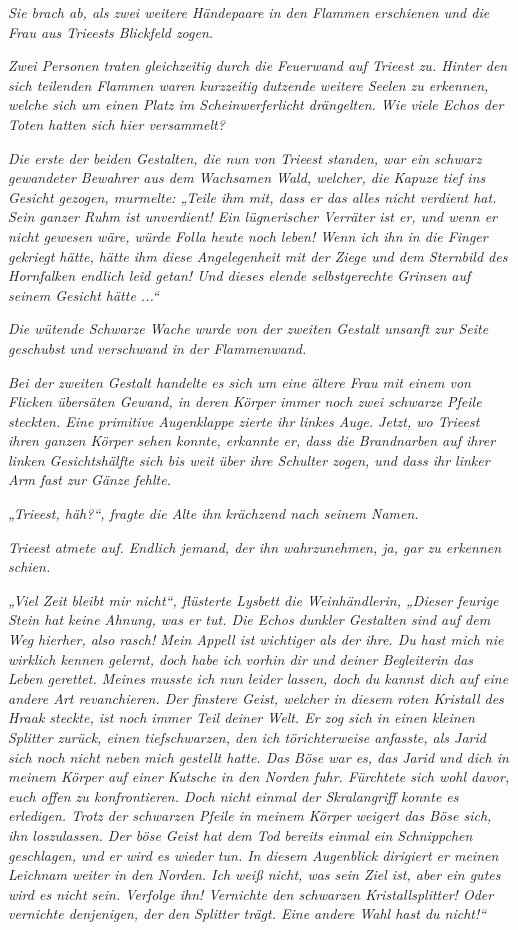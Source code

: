 \textit{Sie brach ab, als zwei weitere Händepaare in den Flammen erschienen und die Frau aus Trieests Blickfeld zogen.}

\textit{Zwei Personen traten gleichzeitig durch die Feuerwand auf Trieest zu. Hinter den sich teilenden Flammen waren kurzzeitig dutzende weitere Seelen zu erkennen, welche sich um einen Platz im Scheinwerferlicht drängelten. Wie viele Echos der Toten hatten sich hier versammelt?}

\textit{Die erste der beiden Gestalten, die nun von Trieest standen, war ein schwarz gewandeter Bewahrer aus dem Wachsamen Wald, welcher, die Kapuze tief ins Gesicht gezogen, murmelte: „Teile ihm mit, dass er das alles nicht verdient hat. Sein ganzer Ruhm ist unverdient! Ein lügnerischer Verräter ist er, und wenn er nicht gewesen wäre, würde Folla heute noch leben! Wenn ich ihn in die Finger gekriegt hätte, hätte ihm diese Angelegenheit mit der Ziege und dem Sternbild des Hornfalken endlich leid getan! Und dieses elende selbstgerechte Grinsen auf seinem Gesicht hätte ...“}

\textit{Die wütende Schwarze Wache wurde von der zweiten Gestalt unsanft zur Seite geschubst und verschwand in der Flammenwand.}

\textit{Bei der zweiten Gestalt handelte es sich um eine ältere Frau mit einem von Flicken übersäten Gewand, in deren Körper immer noch zwei schwarze Pfeile steckten. Eine primitive Augenklappe zierte ihr linkes Auge. Jetzt, wo Trieest ihren ganzen Körper sehen konnte, erkannte er, dass die Brandnarben auf ihrer linken Gesichtshälfte sich bis weit über ihre Schulter zogen, und dass ihr linker Arm fast zur Gänze fehlte.}

\textit{„Trieest, häh?“, fragte die Alte ihn krächzend nach seinem Namen.}

\textit{Trieest atmete auf. Endlich jemand, der ihn wahrzunehmen, ja, gar zu erkennen schien.}

\textit{„Viel Zeit bleibt mir nicht“, flüsterte Lysbett die Weinhändlerin, „Dieser feurige Stein hat keine Ahnung, was er tut. Die Echos dunkler Gestalten sind auf dem Weg hierher, also rasch! Mein Appell ist wichtiger als der ihre. Du hast mich nie wirklich kennen gelernt, doch habe ich vorhin dir und deiner Begleiterin das Leben gerettet. Meines musste ich nun leider lassen, doch du kannst dich auf eine andere Art revanchieren. Der finstere Geist, welcher in diesem roten Kristall des Hraak steckte, ist noch immer Teil deiner Welt. Er zog sich in einen kleinen Splitter zurück, einen tiefschwarzen, den ich törichterweise anfasste, als Jarid sich noch nicht neben mich gestellt hatte. Das Böse war es, das Jarid und dich in meinem Körper auf einer Kutsche in den Norden fuhr. Fürchtete sich wohl davor, euch offen zu konfrontieren. Doch nicht einmal der Skralangriff konnte es erledigen. Trotz der schwarzen Pfeile in meinem Körper weigert das Böse sich, ihn loszulassen. Der böse Geist hat dem Tod bereits einmal ein Schnippchen geschlagen, und er wird es wieder tun. In diesem Augenblick dirigiert er meinen Leichnam weiter in den Norden. Ich weiß nicht, was sein Ziel ist, aber ein gutes wird es nicht sein. Verfolge ihn! Vernichte den schwarzen Kristallsplitter! Oder vernichte denjenigen, der den Splitter trägt. Eine andere Wahl hast du nicht!“}

